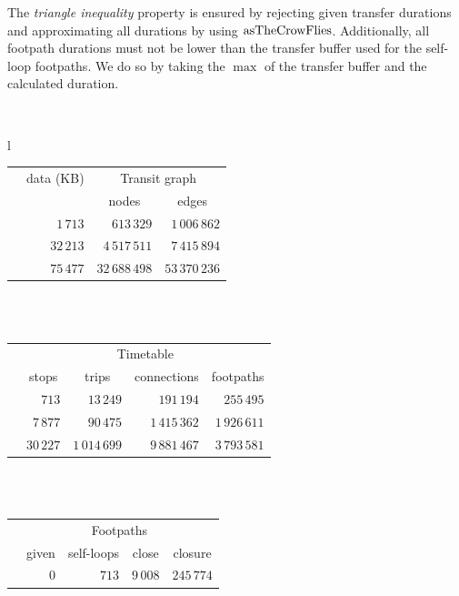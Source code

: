 	The \textit{triangle inequality} property is ensured by rejecting given transfer durations and approximating all durations by using $\operatorname{asTheCrowFlies}$.
	Additionally, all footpath durations must not be lower than the transfer buffer used for the self-loop footpaths. We do so by taking the
	$\max$ of the transfer buffer and the calculated duration.
	\begin{table}[ht]
	 	\begin{center}
	 		\phantom{v}\quad\\
	 		\begin{tabular}{l}
			\begin{tabular}{|l||r|r|r|}
				\hline
							&\multicolumn{1}{c|}{data (KB)}	&\multicolumn{2}{c|}{Transit graph}\\
							&	&\multicolumn{1}{c|}{nodes}	&\multicolumn{1}{c|}{edges}\\\hline
				\freiburgR		&$1\,713$		&$613\,329$		&$1\,006\,862$\\
				\stuttgartR		&$32\,213$		&$4\,517\,511$	&$7\,415\,894$\\
				\switzerlandR	&$75\,477$		&$32\,688\,498$	&$53\,370\,236$\\\hline
			\end{tabular}\\
			\quad\\
			\begin{tabular}{|l||r|r|r|r|}
				\hline
							&\multicolumn{4}{c|}{Timetable}\\
							&\multicolumn{1}{c|}{stops}	&\multicolumn{1}{c|}{trips}
								&\multicolumn{1}{c|}{connections} &\multicolumn{1}{c|}{footpaths}\\\hline
				\freiburgR		&$713$	&$13\,249$		&$191\,194$		&$255\,495$\\
				\stuttgartR		&$7\,877$	&$90\,475$		&$1\,415\,362$	&$1\,926\,611$\\
				\switzerlandR	&$30\,227$	&$1\,014\,699$	&$9\,881\,467$	&$3\,793\,581$\\\hline
			\end{tabular}\\
			\quad\\
			\begin{tabular}{|l||r|r|r|r|}
				\hline
							&\multicolumn{4}{c|}{Footpaths}\\
							&\multicolumn{1}{c|}{given}	&\multicolumn{1}{c|}{self-loops}
								&\multicolumn{1}{c|}{close} &\multicolumn{1}{c|}{closure}\\\hline
				\freiburgR		&$0$		&$713$		&$9\,008$		&$245\,774$\\

\end{tabular}
\end{tabular}
\end{center}
\end{table}
